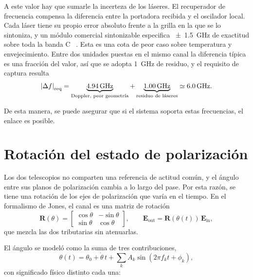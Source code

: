 A este valor hay que sumarle la incerteza de los l\'aseres. El recuperador de
frecuencia compensa la diferencia entre la portadora recibida y el oscilador
local. Cada l\'aser tiene su propio error absoluto frente a la grilla en la
que se lo sintoniza, y un m\'odulo comercial sintonizable especifica
\SI{\pm1.5}{\giga\hertz} de exactitud sobre toda la banda C ~\cite{ppcl500}. Esta es una cota de peor caso sobre temperatura y
envejecimiento. Entre dos unidades puestas en el mismo canal la diferencia
t\'ipica es una fracci\'on del valor, as\'i que se adopta
\SI{1}{\giga\hertz} de residuo, y el requisito de captura resulta
\begin{equation}
  \left\lvert \Delta f \right\rvert_{\mathrm{req}}
    = \underbrace{\SI{4.94}{\giga\hertz}}_{\text{Doppler, peor geometr\'ia}}
    + \underbrace{\SI{1.00}{\giga\hertz}}_{\text{residuo de l\'aseres}}
    \simeq \SI{6.0}{\giga\hertz}.
  \label{eq:requisito-captura}
\end{equation}

De esta manera, se puede asegurar que si el sistema soporta estas frecuencias, el enlace es posible.

\section{Rotaci\'on del estado de polarizaci\'on}
\label{sec:canal-sop}

Los dos telescopios no comparten una
referencia de actitud com\'un, y el \'angulo entre sus planos de polarizaci\'on
cambia a lo largo del pase. Por esta raz\'on, se tiene una rotaci\'on de los ejes de polarizaci\'on que var\'ia en el tiempo. En el formalismo de Jones, el canal es una matriz
de rotaci\'on
\begin{equation}
  \mathbf{R}(\theta) =
  \begin{bmatrix} \cos\theta & -\sin\theta \\ \sin\theta & \cos\theta \end{bmatrix},
  \qquad
  \mathbf{E}_{\mathrm{out}} = \mathbf{R}(\theta(t))\,\mathbf{E}_{\mathrm{in}},
  \label{eq:jones}
\end{equation}
que mezcla las dos tributarias sin atenuarlas.

El \'angulo se model\'o como la suma de tres contribuciones,
\begin{equation}
  \theta(t) = \theta_{0} + \dot{\theta}\,t
            + \sum_{k} A_{k}\sin(2\pi f_{k} t + \phi_{k}),
  \label{eq:sop}
\end{equation}
con significado f\'isico distinto cada una:

